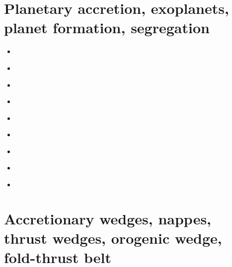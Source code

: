 \section{Planetary accretion, exoplanets, planet formation, segregation}

\begin{small}
\begin{itemize}
\item[\twothousandeight] 
\item[\twothousandnine] 
\\
\item[\twothousandten] 
\item[\twothousandeleven] 
\\
\item[\twothousandthirteen] 
\item[\twothousandfourteen] 
\\
\item[\twothousandfifteen] 
\item[\twothousandnineteen] 
\\
\item[\twothousandtwenty] 
\end{itemize}
\end{small}

\section{Accretionary wedges, nappes, thrust wedges, orogenic wedge, fold-thrust belt} 

